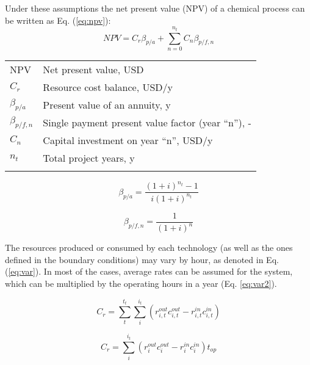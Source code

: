 \documentclass[10pt,twoside,a4paper]{report}
\begin{document}
Under these assumptions the net present value (NPV) of a chemical process
can be written as Eq. (\ref{eq:npv}):
\begin{equation}
  \label{eq:npv}
  NPV = C_{r}\beta_{p/a} + \sum_{n=0}^{n_t}C_{n}\beta_{p/f,n} %
\end{equation}

\begin{tabular}[h]{ll}
  NPV & Net present value, USD\\
  $C_{r}$ & Resource cost balance, USD/y\\
  $\beta_{p/a} $& Present value of an annuity, y\\
  $\beta_{p/f,n} $& Single payment present value factor (year ``n''), -\\
  $C_{n}$ & Capital investment on year ``n'', USD/y \\
  $n_t$ & Total project years, y \\
  \\
\end{tabular}

\begin{equation}
  \beta_{p/a} = \frac{(1+i)^{n_t}-1}{i(1+i)^{n_t}}
\end{equation}

\begin{equation}
  \beta_{p/f,n} = \frac{1}{(1+i)^n}
\end{equation}


The resources produced or consumed by each technology (as well as the
ones defined in the boundary conditions) may vary by hour, as denoted
in Eq. (\ref{eq:var}). In most of the cases, average rates can be assumed for the
system, which can be multiplied by the operating hours in a year
(Eq. \ref{eq:var2}).

\begin{equation}
  \label{eq:var}
  C_{r} = \sum_t^{t_t}\sum_i^{i_t}(r^{out}_{i,t}c_{i,t}^{out}-r^{in}_{i,t}c_{i,t}^{in})
\end{equation}

\begin{equation}
  \label{eq:var2}
  C_{r} = \sum_i^{i_t}(r^{out}_ic_i^{out}-r^{in}_ic_i^{in})t_{op}
\end{equation}
\end{document}
